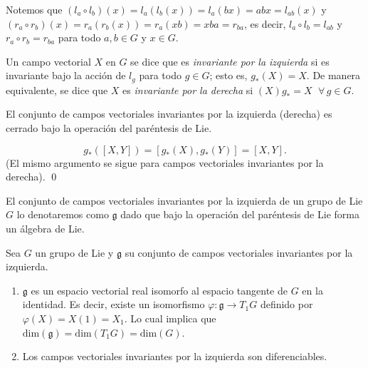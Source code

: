 \begin{obs}
Notemos que  $(l_{a} \circ l_{b}) (x) = l_{a} (l_{b} (x)) = l_{a} (bx) = abx = l_{ab} (x)$ y $(r_{a} \circ r_{b}) (x) = r_{a} (r_{b} (x)) = r_{a} (xb) = xba = r_{ba}$, es decir, $l_{a} \circ l_{b} = l_{ab}$ y $r_{a} \circ r_{b} = r_{ba}$ para todo $a, b \in G$ y $x \in G$.
\end{obs}

\begin{mydef} \cite{Warner}
Un campo vectorial $X$ en $G$ se dice que es \emph{invariante por la izquierda} si es invariante bajo la acci\'{o}n de $l_{g}$ para todo $g \in G$; esto es, $g_{*} (X) = X$. De manera equivalente, se dice que $X$ es \emph{invariante por la derecha} si $(X)g_{*} = X$ $\; \forall \, g \in G$.
\end{mydef}

\begin{thm} \cite{Warner}
El conjunto de campos vectoriales invariantes por la izquierda (derecha) es cerrado bajo la operaci\'{o}n del par\'{e}ntesis de Lie.
\end{thm}
%
\begin{dem}
$$g_{*} ([X, Y]) = [g_{*} (X), g_{*} (Y)] = [X, Y].$$ (El mismo argumento se sigue para campos vectoriales invariantes por la derecha). \qed
\end{dem}

\begin{pro} \cite{Warner}
\label{pro:LeftInvariantLieAlgebra}
El conjunto de campos vectoriales invariantes por la izquierda de un grupo de Lie $G$ lo denotaremos como $\mathfrak{g}$ dado que bajo la operaci\'{o}n del par\'{e}ntesis de Lie forma un \'{a}lgebra de Lie.
\end{pro}

\begin{pro} \cite{Warner}
Sea $G$ un grupo de Lie y $\mathfrak{g}$ su conjunto de campos vectoriales invariantes por la izquierda.
%
\begin{enumerate}
\item{$\mathfrak{g}$ es un espacio vectorial real isomorfo al espacio tangente de $G$ en la identidad. Es decir, existe un isomorfismo $\varphi: \mathfrak{g} \rightarrow T_{1} G$ definido por $\varphi(X) = X(1) = X_{1}$. Lo cual implica que $\mathrm{dim} (\mathfrak{g}) = \mathrm{dim} (T_{1} G) = \mathrm{dim} (G)$.}
\item{Los campos vectoriales invariantes por la izquierda son diferenciables.}
\end{enumerate}
%
\end{pro}

